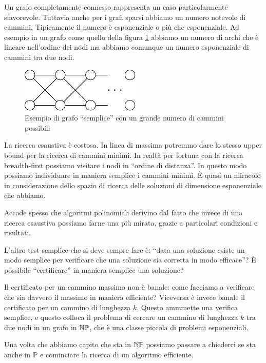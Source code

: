 Un grafo completamente connesso rappresenta un caso particolarmente sfavorevole. Tuttavia anche per
i grafi sparsi abbiamo un numero notevole di cammini. Tipicamente il numero è esponenziale o più
che esponenziale. Ad esempio in un grafo come quello della figura \ref{PathsNumber} abbiamo un
numero di archi che è lineare nell'ordine dei nodi ma abbiamo comunque un numero esponenziale di
cammini tra due nodi.

\begin{figure}[h]
    \begin{center}
        \includegraphics{img/ExponentialPathsNumber.pdf}
    \end{center}
    \caption{Esempio di grafo ``semplice'' con un grande numero di cammini possibili}
    \label{PathsNumber}
\end{figure}

La ricerca esaustiva è costosa. In linea di massima potremmo dare lo stesso upper bound per la
ricerca di cammini minimi. In realtà per fortuna con la ricerca breadth-first possiamo visitare i
nodi in ``ordine di distanza''. In questo modo possiamo individuare in maniera semplice i cammini
minimi. È quasi un miracolo in considerazione dello spazio di ricerca delle soluzioni di dimensione
esponenziale che abbiamo. 

Accade spesso che algoritmi polinomiali derivino dal fatto che invece di una ricerca esaustiva
possiamo farne una più mirata, grazie a particolari condizioni e risultati.

L'altro test semplice che si deve sempre fare è: ``data una soluzione esiste un modo semplice per
verificare che una soluzione sia corretta in modo efficace''? È possibile ``certificare'' in maniera
semplice una soluzione?

Il certificato per un cammino massimo non è banale: come facciamo a verificare che sia davvero il
massimo in maniera efficiente? Viceversa è invece banale il certificato per un cammino di lunghezza
$k$. Questo ammmette una verifica semplice, e questo colloca il problema di cercare un cammino di
lunghezza $k$ tra due nodi in un grafo in $\mathbb{NP}$, che è una classe piccola di problemi
esponenziali.

Una volta che abbiamo capito che sta in $\mathbb{NP}$ possiamo passare a chiederci se sta anche in
$\mathbb{P}$ e cominciare la ricerca di un algoritmo efficiente.

